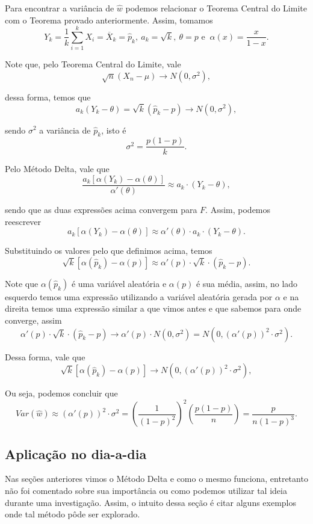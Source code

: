 \documentclass{article}
\begin{document}
Para encontrar a variância de $\hat{w}$ podemos relacionar o Teorema Central do Limite com o Teorema provado anteriormente. Assim, tomamos
\[Y_k = \dfrac{1}{k}\sum_{i = 1}^{k} X_i = \overline{X}_k = \hat{p}_k, ~a_k = \sqrt{k}, ~\theta = p \mbox{ e } ~\alpha(x) = \dfrac{x}{1 - x}.\]

Note que, pelo Teorema Central do Limite, vale
\[\sqrt{n}(X_n - \mu) \to N(0, \sigma^2),\]

dessa forma, temos que
\[a_k(Y_k - \theta) = \sqrt{k}(\hat{p}_k - p) \to N(0, \sigma^2),\]

sendo $\sigma^2$ a variância de $\hat{p}_k$, isto é
\[\sigma^2 = \dfrac{p(1 - p)}{k}.\]

Pelo Método Delta, vale que 
\[\dfrac{a_k[\alpha(Y_k) - \alpha(\theta)]}{\alpha'(\theta)} \approx a_k\cdot (Y_k - \theta),\]

sendo que as duas expressões acima convergem para $F$. Assim, podemos reescrever
\[a_k[\alpha(Y_k) - \alpha(\theta)] \approx \alpha'(\theta)\cdot a_k\cdot (Y_k - \theta).\]

Substituindo os valores pelo que definimos acima, temos
\[\sqrt{k}[\alpha(\hat{p}_k) - \alpha(p)] \approx \alpha'(p)\cdot \sqrt{k}\cdot (\hat{p}_k - p).\]

Note que $\alpha(\hat{p}_k)$ é uma variável aleatória e $\alpha(p)$ é sua média, assim, no lado esquerdo temos uma expressão utilizando a variável aleatória gerada por $\alpha$ e na direita temos uma expressão similar a que vimos antes e que sabemos para onde converge, assim
\[\alpha'(p)\cdot \sqrt{k}\cdot (\hat{p}_k - p) \to \alpha'(p)\cdot N(0, \sigma^2) = N(0, (\alpha'(p))^2\cdot \sigma^2).\]

Dessa forma, vale que
\[\sqrt{k}[\alpha(\hat{p}_k) - \alpha(p)] \to N(0, (\alpha'(p))^2\cdot \sigma^2),\]

Ou seja, podemos concluir que
\[Var(\hat{w}) \approx (\alpha'(p))^2\cdot \sigma^2 = \left(\dfrac{1}{(1 - p)^2}\right)^2\left(\dfrac{p(1 - p)}{n}\right) = \dfrac{p}{n(1 - p)^3}.\]

\subsection*{Aplicação no dia-a-dia}

Nas seções anteriores vimos o Método Delta e como o mesmo funciona, entretanto não foi comentado sobre sua importância ou como podemos utilizar tal ideia durante uma investigação. Assim, o intuito dessa seção é citar alguns exemplos onde tal método pôde ser explorado.
\end{document}
